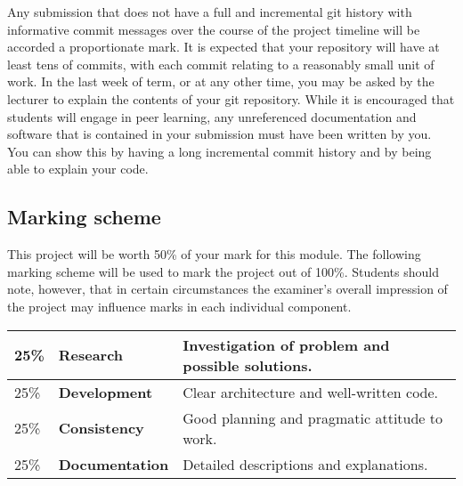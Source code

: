 \documentclass[12pt, a4paper]{article}
\begin{document}
Any submission that does not have a full and incremental git history with informative commit messages over the course of the project timeline will be accorded a proportionate mark.
It is expected that your repository will have at least tens of commits, with each commit relating to a reasonably small unit of work.
In the last week of term, or at any other time, you may be asked by the lecturer to explain the contents of your git repository.
While it is encouraged that students will engage in peer learning, any unreferenced documentation and software that is contained in your submission must have been written by you.
You can show this by having a long incremental commit history and by being able to explain your code.

\subsection*{}

\subsection*{Marking scheme}
This project will be worth 50\% of your mark for this module.
The following marking scheme will be used to mark the project out of 100\%.
Students should note, however, that in certain circumstances the examiner's overall impression of the project may influence marks in each individual component.

\begin{center}
  \begin{tabular}{llp{8.4cm}}
    \toprule
    25\% & \textbf{Research} & Investigation of problem and possible solutions. \\
    \midrule
    25\% & \textbf{Development} & Clear architecture and well-written code. \\
    \midrule
    25\% & \textbf{Consistency} & Good planning and pragmatic attitude to work. \\
    \midrule
    25\% & \textbf{Documentation} & Detailed descriptions and explanations. \\
    \bottomrule
  \end{tabular}
\end{center}
\end{document}
